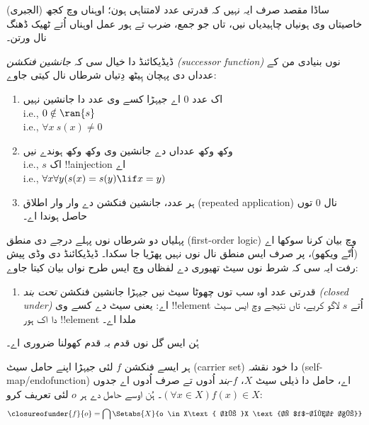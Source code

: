 \documentclass[../../../include/open-logic-section]{subfiles}
\begin{document}

ساڈا مقصد صرف ایہ نہیں کہ قدرتی عدد لامتناہی ہون؛ اوہناں وچ کجھ
(الجبری) خاصیتاں وی ہونیاں چاہیدیاں نیں، تاں جو جمع، ضرب تے ہور
عمل اوہناں اُتے ٹھیک ڈھنگ نال ورتن۔

ڈیڈیکائنڈ دا خیال سی کہ \emph{جانشین فنکشن (successor function)} نوں
بنیادی من کے عدداں دی پہچان ہِیٹھ دِتیاں شرطاں نال کیتی جاوے:
\begin{enumerate}
	\item اک عدد $0$ اے جیہڑا کسے وی عدد دا جانشین نہیں
	\\i.e., $0 \notin \ran{s}$
	\\i.e., $\forall x\ s(x) \neq 0$
	\item وکھ وکھ عدداں دے جانشین وی وکھ وکھ ہوندے نیں
	\\i.e., $s$ اک !!a{injection} اے
	\\i.e., $\forall x \forall y (s(x) = s(y) \lif x = y)$
	\item{} ہر عدد، جانشین فنکشن دے وار وار
	اطلاق (repeated application) نال $0$ توں حاصل ہوندا اے۔
\end{enumerate}
پہلیاں دو شرطاں نوں پہلے درجے دی منطق (first-order logic) وچ بیان
کرنا سوکھا اے (اُتّے ویکھو)، پر صرف ایس منطق نال
 نوں نہیں پھڑیا جا سکدا۔ ڈیڈیکائنڈ دی وڈی
پیش رفت ایہ سی کہ شرط  نوں سیٹ تھیوری دے
لفظاں وچ ایس طرح نواں بیان کیتا جاوے:
\begin{enumerate}
	\item[3$'$.] قدرتی عدد اوہ سب توں چھوٹا سیٹ نیں جیہڑا
	جانشین فنکشن \emph{تحت بند (closed under)} اے: یعنی سیٹ دے کسے
	وی !!{element} اُتے $s$ لاگو کریے، تاں نتیجے وچ ایس سیٹ دا اک
	ہور !!{element} ملدا اے۔
\end{enumerate}
ہُن ایس گل نوں قدم بہ قدم کھولنا ضروری اے۔

\begin{defn}
	ہر ایسے فنکشن $f$ لئی جیہڑا اپنے حامل سیٹ (carrier set) دا خود نقشہ
	(self-map/endofunction) اے، حامل دا ذیلی سیٹ $X$، $f$-\emph{بند}
	{اُدوں تے صرف اُدوں} اے جدوں $(\forall x \in X)f(x) \in X$۔ ہُن
	اوسے حامل دے ہر $o$ لئی تعریف کرو:
	$$\closureofunder{f}{o} = \bigcap\Setabs{X}{o \in X\text{ تے }X
\text{، $f$-بند اے}}$$
\end{defn}
\end{document}
